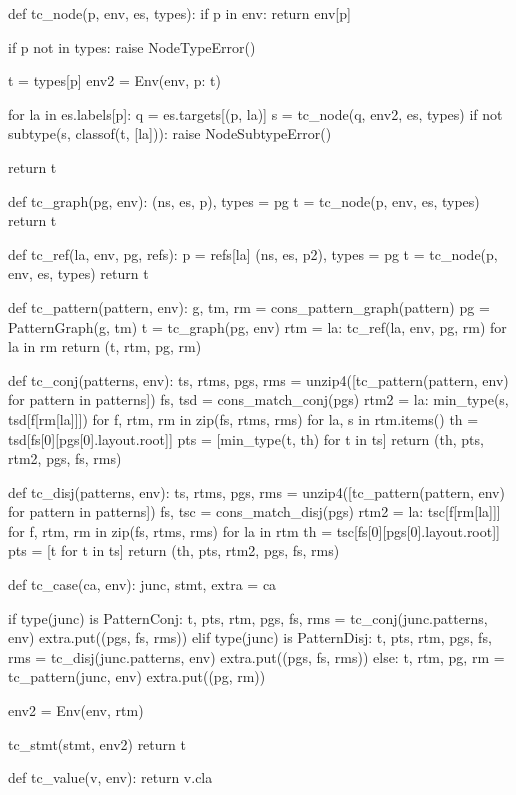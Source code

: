 \begin{dispPy}
def tc_node(p, env, es, types):
    if p in env:
        return env[p]

    if p not in types:
        raise NodeTypeError()

    t = types[p]
    env2 = Env(env, {p: t})

    for la in es.labels[p]:
        q = es.targets[(p, la)]
        s = tc_node(q, env2, es, types)
        if not subtype(s, classof(t, [la])):
            raise NodeSubtypeError()

    return t

def tc_graph(pg, env):
    (ns, es, p), types = pg
    t = tc_node(p, env, es, types)
    return t

def tc_ref(la, env, pg, refs):
    p = refs[la]
    (ns, es, p2), types = pg
    t = tc_node(p, env, es, types)
    return t

def tc_pattern(pattern, env):
    g, tm, rm = cons_pattern_graph(pattern)
    pg = PatternGraph(g, tm)
    t = tc_graph(pg, env)
    rtm = {la: tc_ref(la, env, pg, rm) for la in rm}
    return (t, rtm, pg, rm)

def tc_conj(patterns, env):
    ts, rtms, pgs, rms = unzip4([tc_pattern(pattern, env) for pattern in patterns])
    fs, tsd = cons_match_conj(pgs)
    rtm2 = {la: min_type(s, tsd[f[rm[la]]])
            for f, rtm, rm in zip(fs, rtms, rms) for la, s in rtm.items()}
    th = tsd[fs[0][pgs[0].layout.root]]
    pts = [min_type(t, th) for t in ts]
    return (th, pts, rtm2, pgs, fs, rms)

def tc_disj(patterns, env):
    ts, rtms, pgs, rms = unzip4([tc_pattern(pattern, env) for pattern in patterns])
    fs, tsc = cons_match_disj(pgs)
    rtm2 = {la: tsc[f[rm[la]]] for f, rtm, rm in zip(fs, rtms, rms) for la in rtm}
    th = tsc[fs[0][pgs[0].layout.root]]
    pts = [t for t in ts]
    return (th, pts, rtm2, pgs, fs, rms)

def tc_case(ca, env):
    junc, stmt, extra = ca

    if type(junc) is PatternConj:
        t, pts, rtm, pgs, fs, rms = tc_conj(junc.patterns, env)
        extra.put((pgs, fs, rms))
    elif type(junc) is PatternDisj:
        t, pts, rtm, pgs, fs, rms = tc_disj(junc.patterns, env)
        extra.put((pgs, fs, rms))
    else:
        t, rtm, pg, rm = tc_pattern(junc, env)
        extra.put((pg, rm))

    env2 = Env(env, rtm)

    tc_stmt(stmt, env2)
    return t

def tc_value(v, env):
    return v.cla


\end{dispPy}
